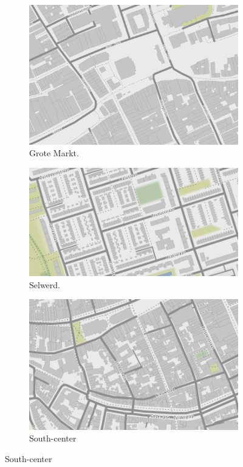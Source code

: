 \begin{figure}[htbp]
\begin{center}
\begin{subfigure}{.5\textwidth}
\includegraphics[width=\linewidth]{../experiments/GroteMarktMaps/maps/groteMarkt.png}
\caption{Grote Markt.}
\end{subfigure}
\begin{subfigure}{.5\textwidth}

\includegraphics[width=\linewidth]{../experiments/GroteMarktMaps/maps/Selwerd.png}
\caption{Selwerd.}
\end{subfigure}

\begin{subfigure}{.5\textwidth}
\includegraphics[width=\linewidth]{../experiments/GroteMarktMaps/maps/zuidCentrum.png}
\caption{South-center}
\end{subfigure}



\end{center}
\end{figure}
